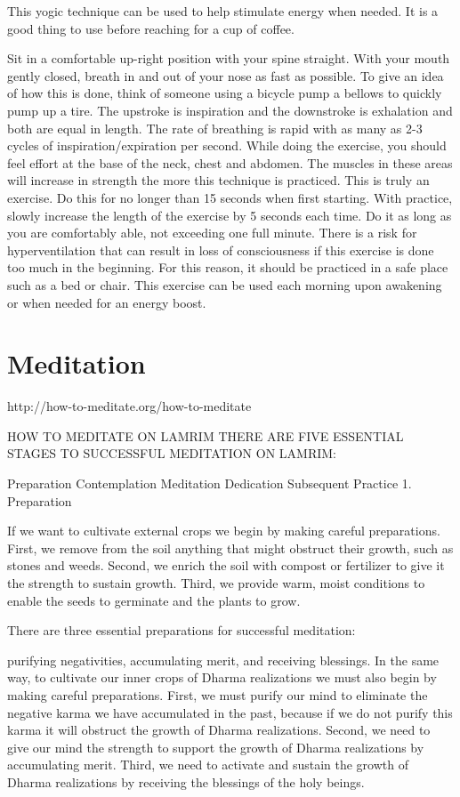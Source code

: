 \documentclass{book}\usepackage[]{graphicx}\usepackage[]{color}
\begin{document}
This yogic technique can be used to help stimulate energy when needed. It is a good thing to use before reaching for a cup of coffee.

Sit in a comfortable up-right position with your spine straight.
With your mouth gently closed, breath in and out of your nose as fast as possible. To give an idea of how this is done, think of someone using a bicycle pump a bellows to quickly pump up a tire. The upstroke is inspiration and the downstroke is exhalation and both are equal in length.
The rate of breathing is rapid with as many as 2-3 cycles of inspiration/expiration per second.
While doing the exercise, you should feel effort at the base of the neck, chest and abdomen. The muscles in these areas will increase in strength the more this technique is practiced. This is truly an exercise.
Do this for no longer than 15 seconds when first starting. With practice, slowly increase the length of the exercise by 5 seconds each time. Do it as long as you are comfortably able, not exceeding one full minute.
There is a risk for hyperventilation that can result in loss of consciousness if this exercise is done too much in the beginning. For this reason, it should be practiced in a safe place such as a bed or chair.
This exercise can be used each morning upon awakening or when needed for an energy boost.


\chapter{Meditation}

http://how-to-meditate.org/how-to-meditate

HOW TO MEDITATE ON LAMRIM
THERE ARE FIVE ESSENTIAL STAGES TO SUCCESSFUL MEDITATION ON LAMRIM:

Preparation
Contemplation
Meditation
Dedication
Subsequent Practice
1. Preparation

If we want to cultivate external crops we begin by making careful preparations. First, we remove from the soil anything that might obstruct their growth, such as stones and weeds. Second, we enrich the soil with compost or fertilizer to give it the strength to sustain growth. Third, we provide warm, moist conditions to enable the seeds to germinate and the plants to grow.

There are three essential preparations for successful meditation:

purifying negativities, accumulating merit, and receiving blessings.
In the same way, to cultivate our inner crops of Dharma realizations we must also begin by making careful preparations. First, we must purify our mind to eliminate the negative karma we have accumulated in the past, because if we do not purify this karma it will obstruct the growth of Dharma realizations. Second, we need to give our mind the strength to support the growth of Dharma realizations by accumulating merit. Third, we need to activate and sustain the growth of Dharma realizations by receiving the blessings of the holy beings.
\end{document}
